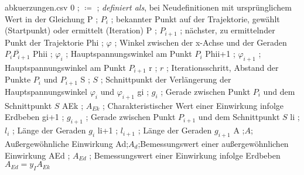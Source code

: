 \begin{filecontents*}{abkuerzungen.csv}
	0 ; $\coloneqq$ ; \textit{definiert als}, bei Neudefinitionen mit ursprünglichem Wert in der Gleichung
	P ; $P_{i}$ ; bekannter Punkt auf der Trajektorie, gewählt (Startpunkt) oder ermittelt (Iteration)
	P ; $P_{i+1}$ ; nächster, zu ermittelnder Punkt der Trajektorie
	Phi ; $\varphi$ ; Winkel zwischen der x-Achse und der Geraden $\overline{P_{i}P_{i+1}}$
	Phii ; $\varphi_{i}$ ; Hauptspannungswinkel am Punkt $P_{i}$ 
	Phii+1 ; $\varphi_{i+1}$ ; Hauptspannungswinkel am Punkt $P_{i+1}$ 
	r ; $r$ ; Iterationsschritt, Abstand der Punkte $P_{i}$ und $P_{i+1}$
	S ; $S$ ; Schnittpunkt der Verlängerung der Hauptspannungswinkel $\varphi_{i}$ und $\varphi_{i+1}$
	gi ; $g_{i}$ ; Gerade zwischen Punkt $P_{i}$ und dem Schnittpunkt $S$
	AEk ; $A_{Ek}$ ; Charakteristischer Wert einer Einwirkung infolge Erdbeben
	gi+1 ; $g_{i+1}$ ; Gerade zwischen Punkt $P_{i+1}$ und dem Schnittpunkt $S$ 
	li ; $l_{i}$ ; Länge der Geraden $g_{i}$
	li+1 ; $l_{i+1}$ ; Länge der Geraden $g_{i+1}$
	A ;$A$; Außergewöhnliche Einwirkung
	Ad;$A_{d}$;Bemessungswert einer außergewöhnlichen Einwirkung
	AEd ; $A_{Ed}$ ; Bemessungswert einer Einwirkung infolge Erdbeben $A_{Ed} = y_{I}A_{Ek}$
\end{filecontents*}
\abkuerzungsverzeichnis